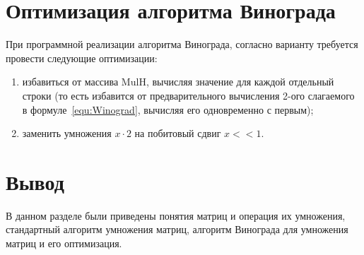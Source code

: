 \section{Оптимизация алгоритма Винограда}

При программной реализации алгоритма Винограда, согласно варианту требуется провести следующие оптимизации:
\begin{enumerate}[label=\arabic*)]
	\item избавиться от массива MulH, вычисляя значение для каждой отдельный строки (то есть избавится от предварительного вычисления 2-ого слагаемого в формуле~\eqref{equ:Winograd}, вычисляя его одновременно с первым);
	\item заменить умножения $x \cdot 2$ на побитовый сдвиг $x << 1$.
\end{enumerate}

\section*{Вывод}

В данном разделе были приведены понятия матриц и операция их умножения, стандартный алгоритм умножения матриц, алгоритм Винограда для умножения матриц и его оптимизация.

\clearpage

